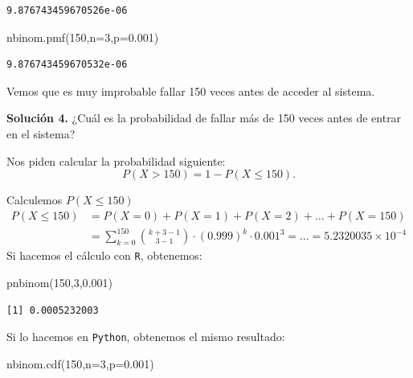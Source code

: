 \documentclass[
  letterpaper,
  DIV=11,
  numbers=noendperiod]{scrreprt}
\newenvironment{Shaded}{\begin{snugshade}}{\end{snugshade}}
\newcommand{\DecValTok}[1]{\textcolor[rgb]{0.68,0.00,0.00}{#1}}
\newcommand{\FloatTok}[1]{\textcolor[rgb]{0.68,0.00,0.00}{#1}}
\newcommand{\FunctionTok}[1]{\textcolor[rgb]{0.28,0.35,0.67}{#1}}
\newcommand{\NormalTok}[1]{\textcolor[rgb]{0.00,0.23,0.31}{#1}}
\newcommand{\OperatorTok}[1]{\textcolor[rgb]{0.37,0.37,0.37}{#1}}
\begin{document}
\begin{verbatim}
9.876743459670526e-06
\end{verbatim}

\begin{Shaded}
\begin{Highlighting}[]
\NormalTok{nbinom.pmf(}\DecValTok{150}\NormalTok{,n}\OperatorTok{=}\DecValTok{3}\NormalTok{,p}\OperatorTok{=}\FloatTok{0.001}\NormalTok{)}
\end{Highlighting}
\end{Shaded}

\begin{verbatim}
9.876743459670532e-06
\end{verbatim}

Vemos que es muy improbable fallar 150 veces antes de acceder al
sistema.

\textbf{Solución 4.} ¿Cuál es la probabilidad de fallar más de 150 veces
antes de entrar en el sistema?

Nos piden calcular la probabilidad siguiente:
\[P(X>150)=1-P(X\leq 150).\]

Calculemos \(P(X\leq 150)\) \[
\begin{array}{rl}
P(X\leq 150) &= P(X=0)+P(X=1)+P(X=2)+\ldots+P(X=150) \\ & = \sum\limits_{k=0}^{150} {k+3-1\choose 3-1} \cdot (0.999)^{k}\cdot 0.001^3= \ldots = \ensuremath{5.2320035\times 10^{-4}}
\end{array}
\] Si hacemos el cálculo con \texttt{R}, obtenemos:

\begin{Shaded}
\begin{Highlighting}[]
\FunctionTok{pnbinom}\NormalTok{(}\DecValTok{150}\NormalTok{,}\DecValTok{3}\NormalTok{,}\FloatTok{0.001}\NormalTok{)}
\end{Highlighting}
\end{Shaded}

\begin{verbatim}
[1] 0.0005232003
\end{verbatim}

Si lo hacemos en \texttt{Python}, obtenemos el mismo resultado:

\begin{Shaded}
\begin{Highlighting}[]
\NormalTok{nbinom.cdf(}\DecValTok{150}\NormalTok{,n}\OperatorTok{=}\DecValTok{3}\NormalTok{,p}\OperatorTok{=}\FloatTok{0.001}\NormalTok{)}
\end{Highlighting}
\end{Shaded}
\end{document}
